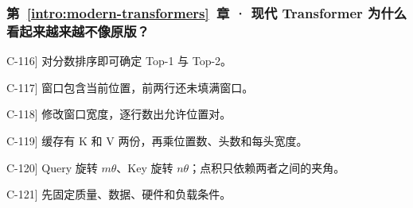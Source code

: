 \subsubsection*{第~\ref*{intro:modern-transformers}~章 · 现代 Transformer 为什么看起来越来越不像原版？}
\begin{answerhints}
\item[\hyperref[exercise:moe-routing]{C-116}] \leavevmode{}\label{hint:moe-routing}对分数排序即可确定 Top-1 与 Top-2。
\item[\hyperref[exercise:sliding-window-pairs]{C-117}] \leavevmode{}\label{hint:sliding-window-pairs}窗口包含当前位置，前两行还未填满窗口。
\item[\hyperref[exercise:sliding-window-code]{C-118}] \leavevmode{}\label{hint:sliding-window-code}修改窗口宽度，逐行数出允许位置对。
\item[\hyperref[exercise:gqa-cache-ratio]{C-119}] \leavevmode{}\label{hint:gqa-cache-ratio}缓存有 K 和 V 两份，再乘位置数、头数和每头宽度。
\item[\hyperref[exercise:rope-relative-position]{C-120}] \leavevmode{}\label{hint:rope-relative-position}Query 旋转 $m\theta$、Key 旋转 $n\theta$；点积只依赖两者之间的夹角。
\item[\hyperref[exercise:architecture-fair-comparison]{C-121}] \leavevmode{}\label{hint:architecture-fair-comparison}先固定质量、数据、硬件和负载条件。
\end{answerhints}
